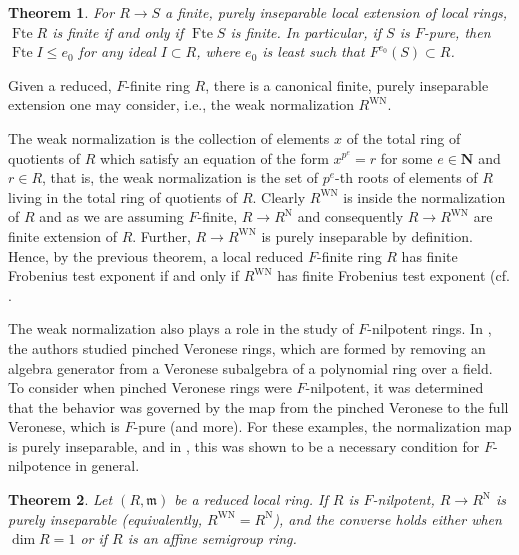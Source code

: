 \documentclass{amsproc}
\newtheorem{theorem}{Theorem}[section]
\theoremstyle{definition}
\theoremstyle{remark}
\numberwithin{equation}{section}
\newcommand{\NN}{\mathbf{N}}
\newcommand{\fm}{\mathfrak{m}}
\newcommand{\fte}{\operatorname{Fte}}
\newcommand{\WN}{\textrm{WN}}
\begin{document}
\begin{theorem}\label{thm:FTEasscent}
For $R \to S$ a finite, purely inseparable local extension of local rings, $\fte R$ is finite if and only if $\fte S$ is finite. In particular, if $S$ is $F$-pure, then $\fte I \le e_0$ for any ideal $I\subset R$, where $e_0$ is least such that $F^{e_0}(S)\subset R$.
\end{theorem}

Given a reduced, $F$-finite ring $R$, there is a canonical finite, purely inseparable extension one may consider, i.e., the weak normalization $R^{\WN}$. %

\begin{center}
\end{center}

The weak normalization is the collection of elements $x$ of the total ring of quotients of $R$ which satisfy an equation of the form $x^{p^e}=r$ for some $e \in \NN$ and $r \in R$, that is, the weak normalization is the set of $p^e$-th roots of elements of $R$ living in the total ring of quotients of $R$. Clearly $R^{\WN}$ is inside the normalization of $R$ and as we are assuming $F$-finite, $R\rightarrow R^{\textrm{N}}$ and consequently $R\rightarrow R^{\WN}$ are finite extension of $R$. Further, $R\rightarrow R^{\WN}$ is purely inseparable by definition. Hence, by the previous theorem, a local reduced $F$-finite ring $R$ has finite Frobenius test exponent if and only if $R^{\WN}$ has finite Frobenius test exponent (cf. \cite[Cor. 4.2]{DMP24}.

The weak normalization also plays a role in the study of $F$-nilpotent rings. In \cite{MP23}, the authors studied pinched Veronese rings, which are formed by removing an algebra generator from a Veronese subalgebra of a polynomial ring over a field. To consider when pinched Veronese rings were $F$-nilpotent, it was determined that the behavior was governed by the map from the pinched Veronese to the full Veronese, which is $F$-pure (and more). For these examples, the normalization map is purely inseparable, and in \cite[Thm. 1.2]{DMP24}, this was shown to be a necessary condition for $F$-nilpotence in general.

\begin{theorem}
Let $(R,\fm)$ be a reduced local ring. If $R$ is $F$-nilpotent, $R \rightarrow R^{\textrm{N}}$ is purely inseparable (equivalently, $R^{\WN}=R^{\textrm{N}}$), and the converse holds either when $\dim R = 1$ or if $R$ is an affine semigroup ring.
\end{theorem}
\end{document}

